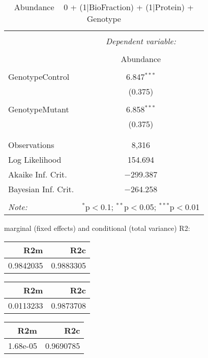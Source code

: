 \documentclass[11pt]{report}
\begin{document}
\begin{table}[!htbp] \centering 
  \caption{Abundance ~ 0 + (1|BioFraction) + (1|Protein) + Genotype} 
  \label{} 
\begin{tabular}{@{\extracolsep{5pt}}lc} 
\\[-1.8ex]\hline 
\hline \\[-1.8ex] 
 & \multicolumn{1}{c}{\textit{Dependent variable:}} \\ 
\cline{2-2} 
\\[-1.8ex] & Abundance \\ 
\hline \\[-1.8ex] 
 GenotypeControl & 6.847$^{***}$ \\ 
  & (0.375) \\ 
  & \\ 
 GenotypeMutant & 6.858$^{***}$ \\ 
  & (0.375) \\ 
  & \\ 
\hline \\[-1.8ex] 
Observations & 8,316 \\ 
Log Likelihood & 154.694 \\ 
Akaike Inf. Crit. & $-$299.387 \\ 
Bayesian Inf. Crit. & $-$264.258 \\ 
\hline 
\hline \\[-1.8ex] 
\textit{Note:}  & \multicolumn{1}{r}{$^{*}$p$<$0.1; $^{**}$p$<$0.05; $^{***}$p$<$0.01} \\ 
\end{tabular} 
\end{table} 
marginal (fixed effects) and conditional (total variance) R2:

\begin{tabular}{r|r}
\hline
R2m & R2c\\
\hline
0.9842035 & 0.9883305\\
\hline
\end{tabular}

\begin{tabular}{r|r}
\hline
R2m & R2c\\
\hline
0.0113233 & 0.9873708\\
\hline
\end{tabular}

\begin{tabular}{r|r}
\hline
R2m & R2c\\
\hline
1.68e-05 & 0.9690785\\
\hline
\end{tabular}
\end{document}
